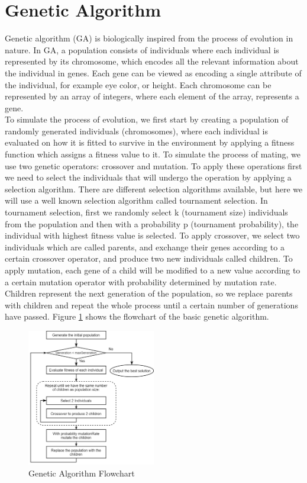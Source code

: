 \documentclass[10pt,journal,compsoc]{IEEEtran}
\begin{document}
\section{Genetic Algorithm}

Genetic algorithm (GA) is biologically inspired from the process of evolution in nature. In GA, a population consists of individuals where each individual is represented by its chromosome, which encodes all the relevant information about the individual in genes. Each gene can be viewed as encoding a single attribute of the individual, for example eye color, or height. Each chromosome can be represented by an array of integers, where each element of the array, represents a gene.\\
To simulate the process of evolution, we first start by creating a population of randomly generated individuals (chromosomes), where each individual is evaluated on how it is fitted to survive in the environment by applying a fitness function which assigns a fitness value to it. To simulate the process of mating, we use two genetic operators: crossover and mutation. To apply these operations first we need to select the individuals that will undergo the operation by applying a selection algorithm. There are different selection algorithms available, but here we will use a well known selection algorithm called tournament selection. In tournament selection, first we randomly select k (tournament size) individuals from the population and then with a probability p (tournament probability), the individual with highest fitness value is selected. To apply crossover, we select two individuals which are called parents, and exchange their genes according to a certain crossover operator, and produce two new individuals called children. To apply mutation, each gene of a child will be modified to a new value according to a certain mutation operator with probability determined by mutation rate. Children represent the next generation of the population, so we replace parents with children and repeat the whole process until a certain number of generations have passed. 
Figure \ref{fig:1} shows the flowchart of the basic genetic algorithm.

\begin{figure}
    \centering
    \includegraphics[width=0.5\textwidth]{png/01.png}
    \caption{Genetic Algorithm Flowchart}
    \label{fig:1}
\end{figure}
\end{document}
